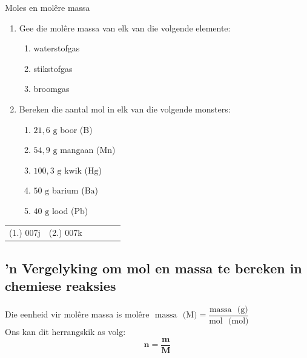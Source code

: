             \begin{exercises}{ Moles en mol\^{e}re massa
      }
            \nopagebreak \noindent \vspace{-2cm}
      \label{m38717*id277281}\begin{enumerate}[noitemsep, label=\textbf{\arabic*}. ] 
            \label{m38717*uid14}\item Gee die mol\^{e}re massa van elk van die volgende elemente:
\label{m38717*id277295}\begin{enumerate}[noitemsep, label=\textbf{\alph*}. ] 
            \label{m38717*uid15}\item waterstofgas
\label{m38717*uid16}\item stikstofgas
\label{m38717*uid17}\item broomgas
\end{enumerate}
                \label{m38717*uid18}\item Bereken die aantal mol in elk van die volgende monsters:
\label{m38717*id277346}\begin{enumerate}[noitemsep, label=\textbf{\alph*}. ] 
            \label{m38717*uid19}\item $21,6 \text{ g}$ boor ($\text{B}$)
\label{m38717*uid20}\item $54,9 \text{ g}$ mangaan ($\text{Mn}$)
\label{m38717*uid21}\item $100,3 \text{ g}$ kwik ($\text{Hg}$)
\label{m38717*uid22}\item $50 \text{ g}$ barium ($\text{Ba}$)
\label{m38717*uid23}\item $40 \text{ g}$ lood ($\text{Pb}$)
\end{enumerate}
                \end{enumerate}
\practiceinfo
\par 
 \par \begin{tabular}[h]{cccccc}
 (1.) 007j  &  (2.) 007k  & \end{tabular}
\end{exercises}
            \subsection*{ 'n Vergelyking om mol en massa te bereken in chemiese reaksies}
            \nopagebreak
      \label{m38717*id277432}Die eenheid vir mol\^{e}re massa is
$\text{mol\^{e}re ~massa ~(M)} = \dfrac{\text{massa ~(g)}}{\text{mol ~(mol)}}$ \\
Ons kan dit herrangskik as volg:
      \label{m38717*id277436}\nopagebreak\noindent{}
    \begin{equation*}
    \mathbf{n} = \dfrac{\mathbf{m}}{\mathbf{M}}
      \end{equation*}

